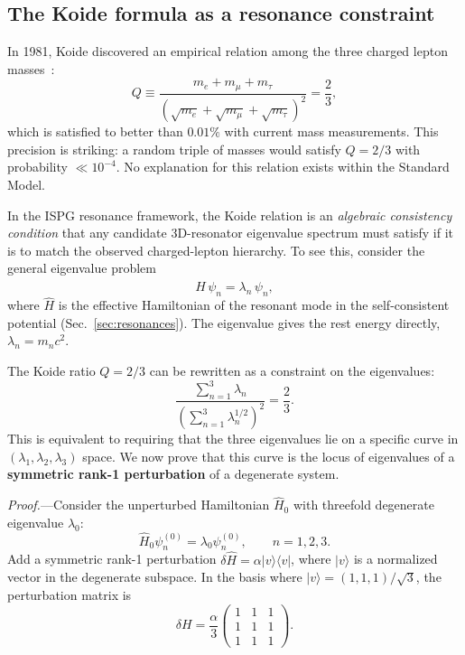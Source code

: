 \documentclass[aps,prd,onecolumn,superscriptaddress,nofootinbib,showpacs,12pt,notitlepage]{revtex4-2}
\begin{document}
\subsection{The Koide formula as a resonance constraint}
\label{sec:koide}

In 1981, Koide discovered an empirical relation among the
three charged lepton masses~\cite{Koide1983,Foot1994,Rivero2005}:
\begin{equation}\label{eq:koide}
  \boxed{
  Q \equiv \frac{m_e + m_\mu + m_\tau}
    {(\sqrt{m_e} + \sqrt{m_\mu} + \sqrt{m_\tau})^{2}}
  = \frac{2}{3},
  }
\end{equation}
which is satisfied to better than $0.01\%$ with current
mass measurements.  This precision is striking: a random
triple of masses would satisfy $Q = 2/3$ with probability
$\ll 10^{-4}$.  No explanation for this relation exists
within the Standard Model.

In the ISPG resonance framework, the Koide relation is an
\emph{algebraic consistency condition} that any candidate
3D-resonator eigenvalue spectrum must satisfy if it is to
match the observed charged-lepton hierarchy.  To see
this, consider the general eigenvalue problem
\begin{equation}\label{eq:gen_eigenvalue}
  \hat{H}\,\psi_n = \lambda_n\,\psi_n,
\end{equation}
where $\hat{H}$ is the effective Hamiltonian of the
resonant mode in the self-consistent potential
(Sec.~\ref{sec:resonances}).  The eigenvalue gives
the rest energy directly, $\lambda_n = m_n c^{2}$.

The Koide ratio $Q = 2/3$ can be rewritten as a
constraint on the eigenvalues:
\begin{equation}\label{eq:koide_constraint}
  \frac{\sum_{n=1}^{3} \lambda_n}
    {\left(\sum_{n=1}^{3} \lambda_n^{1/2}\right)^{2}}
  = \frac{2}{3}.
\end{equation}
This is equivalent to requiring that the three eigenvalues
lie on a specific curve in $(\lambda_1, \lambda_2, \lambda_3)$
space.  We now prove that this curve is the locus of eigenvalues
of a \textbf{symmetric rank-1 perturbation} of a degenerate
system.

\textit{Proof.}---Consider the unperturbed Hamiltonian $\hat{H}_0$
with threefold degenerate eigenvalue $\lambda_0$:
\begin{equation}
  \hat{H}_0 \psi_n^{(0)} = \lambda_0 \psi_n^{(0)}, \qquad n = 1, 2, 3.
\end{equation}
Add a symmetric rank-1 perturbation $\delta\hat{H} = \alpha |v\rangle\langle v|$,
where $|v\rangle$ is a normalized vector in the degenerate subspace.
In the basis where $|v\rangle = (1, 1, 1)/\sqrt{3}$, the perturbation
matrix is
\begin{equation}
  \delta H = \frac{\alpha}{3}
  \begin{pmatrix}
    1 & 1 & 1 \\
    1 & 1 & 1 \\
    1 & 1 & 1
  \end{pmatrix}.
\end{equation}
\end{document}
